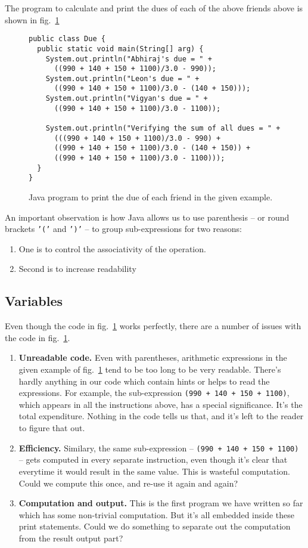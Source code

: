 \documentclass[12pt,a4paper]{article}
\begin{document}
The program to calculate and print the dues of each of the above friends above is shown in fig.~\ref{f:due}
\begin{figure}[H]
\begin{lstlisting}[frame=single]
public class Due {
  public static void main(String[] arg) {
    System.out.println("Abhiraj's due = " +
      ((990 + 140 + 150 + 1100)/3.0 - 990));
    System.out.println("Leon's due = " +
      ((990 + 140 + 150 + 1100)/3.0 - (140 + 150)));
    System.out.println("Vigyan's due = " +
      ((990 + 140 + 150 + 1100)/3.0 - 1100));

    System.out.println("Verifying the sum of all dues = " + 
      (((990 + 140 + 150 + 1100)/3.0 - 990) +
      ((990 + 140 + 150 + 1100)/3.0 - (140 + 150)) +
      ((990 + 140 + 150 + 1100)/3.0 - 1100)));
  }
}
\end{lstlisting}
\caption{Java program to print the due of each friend in the given example.}
\label{f:due}
\end{figure}

An important observation is how Java allows us to use parenthesis -- or round brackets \texttt{'('} and \texttt{')'} -- to group sub-expressions for two reasons:
\begin{enumerate}
	\item One is to control the associativity of the operation.
	\item Second is to increase readability
\end{enumerate}

\subsection{Variables}
Even though the code in fig.~\ref{f:due} works perfectly, there are a number of issues with the code in fig.~\ref{f:due}.
\begin{enumerate}
	\item \textbf{Unreadable code.} Even with parentheses, arithmetic expressions in the given example of fig.~\ref{f:due} tend to be too long to be very readable. There's hardly anything in our code which contain hints or helps to read the expressions. For example, the sub-expression \texttt{(990 + 140 + 150 + 1100)}, which appears in all the instructions above, has a special significance. It's the total expenditure. Nothing in the code tells us that, and it's left to the reader to figure that out.
	\item \textbf{Efficiency.} Similary, the same sub-expression -- \texttt{(990 + 140 + 150 + 1100)} -- gets computed in every separate instruction, even though it's clear that everytime it would result in the same value. This is wasteful computation. Could we compute this once, and re-use it again and again?
	\item \textbf{Computation and output.} This is the first program we have written so far which has some non-trivial computation. But it's all embedded inside these print statements. Could we do something to separate out the computation from the result output part?
\end{enumerate}
\end{document}
